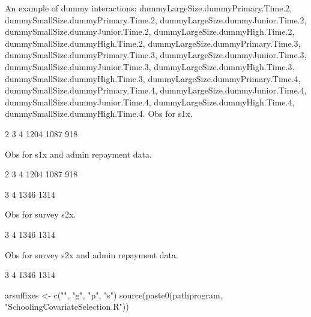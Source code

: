 An example of dummy interactions: \textsf{\footnotesize dummyLargeSize.dummyPrimary.Time.2, dummySmallSize.dummyPrimary.Time.2, dummyLargeSize.dummyJunior.Time.2, dummySmallSize.dummyJunior.Time.2, dummyLargeSize.dummyHigh.Time.2, dummySmallSize.dummyHigh.Time.2, dummyLargeSize.dummyPrimary.Time.3, dummySmallSize.dummyPrimary.Time.3, dummyLargeSize.dummyJunior.Time.3, dummySmallSize.dummyJunior.Time.3, dummyLargeSize.dummyHigh.Time.3, dummySmallSize.dummyHigh.Time.3, dummyLargeSize.dummyPrimary.Time.4, dummySmallSize.dummyPrimary.Time.4, dummyLargeSize.dummyJunior.Time.4, dummySmallSize.dummyJunior.Time.4, dummyLargeSize.dummyHigh.Time.4, dummySmallSize.dummyHigh.Time.4}.
Obs for \textsf{s1x}.
\begin{Schunk}
\begin{Soutput}

   2    3    4 
1204 1087  918 
\end{Soutput}
\end{Schunk}
Obs for \textsf{s1x} and admin repayment data.
\begin{Schunk}
\begin{Soutput}

   2    3    4 
1204 1087  918 
\end{Soutput}
\begin{Soutput}

   3    4 
1346 1314 
\end{Soutput}
\end{Schunk}
Obs for survey \textsf{s2x}.
\begin{Schunk}
\begin{Soutput}

   3    4 
1346 1314 
\end{Soutput}
\end{Schunk}
Obs for survey \textsf{s2x} and admin repayment data.
\begin{Schunk}
\begin{Soutput}

   3    4 
1346 1314 
\end{Soutput}
\end{Schunk}
\begin{Schunk}
\begin{Sinput}
arsuffixes <- c("", "g", "p", "s")
source(paste0(pathprogram, "SchoolingCovariateSelection.R"))
\end{Sinput}
\end{Schunk}



